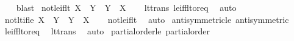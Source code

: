 \begin{isabellebody}
\ \ \isamarkupfalse%
\ blast%
\endisatagproof
{\isafoldproof}%
%
\isadelimproof
\isanewline
%
\endisadelimproof
\isanewline
{}\isamarkupfalse%
\ not{\isacharunderscore}{\kern0pt}le{\isacharunderscore}{\kern0pt}if{\isacharunderscore}{\kern0pt}lt{\isacharcolon}{\kern0pt}\ {\isachardoublequoteopen}X\ {\isacharless}{\kern0pt}\ Y\ {\isasymLongrightarrow}\ {\isasymnot}{\isacharparenleft}{\kern0pt}Y\ {\isasymle}\ X{\isacharparenright}{\kern0pt}{\isachardoublequoteclose}\isanewline
%
\isadelimproof
\ \ %
\endisadelimproof
%
\isatagproof
{}\isamarkupfalse%
\ lt{\isacharunderscore}{\kern0pt}trans\ le{\isacharunderscore}{\kern0pt}iff{\isacharunderscore}{\kern0pt}lt{\isacharunderscore}{\kern0pt}or{\isacharunderscore}{\kern0pt}eq\ \isamarkupfalse%
\ auto%
\endisatagproof
{\isafoldproof}%
%
\isadelimproof
\isanewline
%
\endisadelimproof
\isanewline
{}\isamarkupfalse%
\ not{\isacharunderscore}{\kern0pt}lt{\isacharunderscore}{\kern0pt}if{\isacharunderscore}{\kern0pt}le{\isacharcolon}{\kern0pt}\ {\isachardoublequoteopen}X\ {\isasymle}\ Y\ {\isasymLongrightarrow}\ {\isasymnot}{\isacharparenleft}{\kern0pt}Y\ {\isacharless}{\kern0pt}\ X{\isacharparenright}{\kern0pt}{\isachardoublequoteclose}\isanewline
%
\isadelimproof
\ \ %
\endisadelimproof
%
\isatagproof
{}\isamarkupfalse%
\ not{\isacharunderscore}{\kern0pt}le{\isacharunderscore}{\kern0pt}if{\isacharunderscore}{\kern0pt}lt\ \isamarkupfalse%
\ auto%
\endisatagproof
{\isafoldproof}%
%
\isadelimproof
\isanewline
%
\endisadelimproof
\isanewline
{}\isamarkupfalse%
\ antisymmetric{\isacharunderscore}{\kern0pt}le{\isacharcolon}{\kern0pt}\ {\isachardoublequoteopen}antisymmetric\ {\isacharparenleft}{\kern0pt}{\isasymle}{\isacharparenright}{\kern0pt}{\isachardoublequoteclose}\isanewline
%
\isadelimproof
\ \ %
\endisadelimproof
%
\isatagproof
{}\isamarkupfalse%
\ le{\isacharunderscore}{\kern0pt}iff{\isacharunderscore}{\kern0pt}lt{\isacharunderscore}{\kern0pt}or{\isacharunderscore}{\kern0pt}eq\ \isamarkupfalse%
\ lt{\isacharunderscore}{\kern0pt}trans\ \isamarkupfalse%
\ auto%
\endisatagproof
{\isafoldproof}%
%
\isadelimproof
\isanewline
%
\endisadelimproof
\isanewline
{}\isamarkupfalse%
\ partial{\isacharunderscore}{\kern0pt}order{\isacharunderscore}{\kern0pt}le{\isacharcolon}{\kern0pt}\ {\isachardoublequoteopen}partial{\isacharunderscore}{\kern0pt}order\ {\isacharparenleft}{\kern0pt}{\isasymle}{\isacharparenright}{\kern0pt}{\isachardoublequoteclose}\isanewline

\end{isabellebody}

